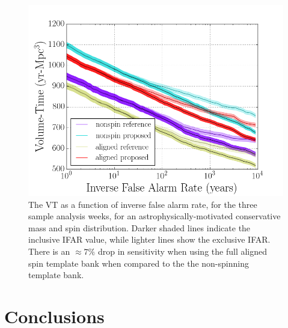 \begin{figure}
\centering
\includegraphics[width=1.0\textwidth]{papers/bns_o1_dev/figures/rest_combined.png}
\caption{\label{fig:rest} 
The VT as a function of inverse false alarm rate, for the
three sample analysis weeks, for an astrophysically-motivated conservative mass and spin distribution. Darker shaded lines indicate the inclusive IFAR value, while lighter lines show the exclusive IFAR. There is an $\approx 7\%$ drop in sensitivity when using the full aligned spin template bank when compared to the the non-spinning
template bank.}
\end{figure}

\section{Conclusions}

